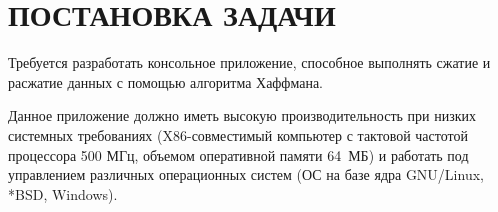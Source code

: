 \section[Постановка задачи]{ПОСТАНОВКА ЗАДАЧИ}

Требуется разработать консольное приложение, способное
выполнять сжатие и расжатие данных с помощью алгоритма Хаффмана.

Данное приложение должно иметь высокую производительность при 
низких системных требованиях
(X86-совместимый компьютер с тактовой
частотой процессора 500 МГц,
объемом оперативной памяти 64~МБ) 
и работать под управлением различных операционных систем
(ОС на базе ядра GNU/Linux, *BSD, Windows).

